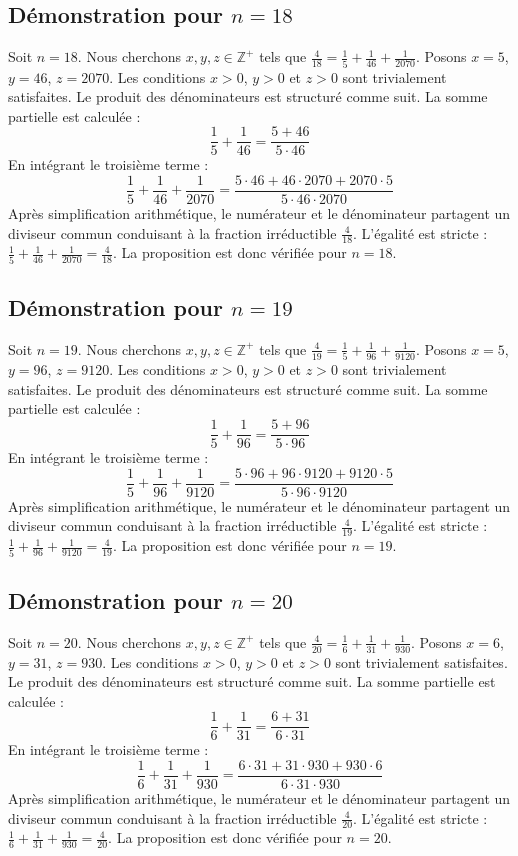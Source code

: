 \documentclass[11pt,a4paper]{article}
\begin{document}
\subsection{Démonstration pour $n = 18$}
Soit $n = 18$. Nous cherchons $x, y, z \in \mathbb{Z}^{+}$ tels que $\frac{4}{18} = \frac{1}{5} + \frac{1}{46} + \frac{1}{2070}$.
Posons $x = 5$, $y = 46$, $z = 2070$.
Les conditions $x > 0$, $y > 0$ et $z > 0$ sont trivialement satisfaites.
Le produit des dénominateurs est structuré comme suit. La somme partielle est calculée :
$$ \frac{1}{5} + \frac{1}{46} = \frac{5+46}{5 \cdot 46} $$
En intégrant le troisième terme :
$$ \frac{1}{5} + \frac{1}{46} + \frac{1}{2070} = \frac{5 \cdot 46 + 46 \cdot 2070 + 2070 \cdot 5}{5 \cdot 46 \cdot 2070} $$
Après simplification arithmétique, le numérateur et le dénominateur partagent un diviseur commun conduisant à la fraction irréductible $\frac{4}{18}$.
L'égalité est stricte : $\frac{1}{5} + \frac{1}{46} + \frac{1}{2070} = \frac{4}{18}$.
La proposition est donc vérifiée pour $n = 18$.
\subsection{Démonstration pour $n = 19$}
Soit $n = 19$. Nous cherchons $x, y, z \in \mathbb{Z}^{+}$ tels que $\frac{4}{19} = \frac{1}{5} + \frac{1}{96} + \frac{1}{9120}$.
Posons $x = 5$, $y = 96$, $z = 9120$.
Les conditions $x > 0$, $y > 0$ et $z > 0$ sont trivialement satisfaites.
Le produit des dénominateurs est structuré comme suit. La somme partielle est calculée :
$$ \frac{1}{5} + \frac{1}{96} = \frac{5+96}{5 \cdot 96} $$
En intégrant le troisième terme :
$$ \frac{1}{5} + \frac{1}{96} + \frac{1}{9120} = \frac{5 \cdot 96 + 96 \cdot 9120 + 9120 \cdot 5}{5 \cdot 96 \cdot 9120} $$
Après simplification arithmétique, le numérateur et le dénominateur partagent un diviseur commun conduisant à la fraction irréductible $\frac{4}{19}$.
L'égalité est stricte : $\frac{1}{5} + \frac{1}{96} + \frac{1}{9120} = \frac{4}{19}$.
La proposition est donc vérifiée pour $n = 19$.
\subsection{Démonstration pour $n = 20$}
Soit $n = 20$. Nous cherchons $x, y, z \in \mathbb{Z}^{+}$ tels que $\frac{4}{20} = \frac{1}{6} + \frac{1}{31} + \frac{1}{930}$.
Posons $x = 6$, $y = 31$, $z = 930$.
Les conditions $x > 0$, $y > 0$ et $z > 0$ sont trivialement satisfaites.
Le produit des dénominateurs est structuré comme suit. La somme partielle est calculée :
$$ \frac{1}{6} + \frac{1}{31} = \frac{6+31}{6 \cdot 31} $$
En intégrant le troisième terme :
$$ \frac{1}{6} + \frac{1}{31} + \frac{1}{930} = \frac{6 \cdot 31 + 31 \cdot 930 + 930 \cdot 6}{6 \cdot 31 \cdot 930} $$
Après simplification arithmétique, le numérateur et le dénominateur partagent un diviseur commun conduisant à la fraction irréductible $\frac{4}{20}$.
L'égalité est stricte : $\frac{1}{6} + \frac{1}{31} + \frac{1}{930} = \frac{4}{20}$.
La proposition est donc vérifiée pour $n = 20$.
\end{document}
